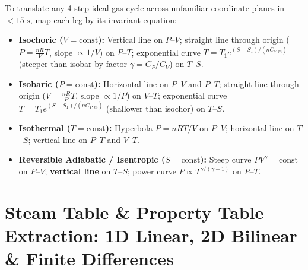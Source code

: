 \begin{shortcut}
To translate any 4-step ideal-gas cycle across unfamiliar coordinate planes in $<15\text{ s}$, map each leg by its invariant equation:
\begin{itemize}
  \item \textbf{Isochoric ($V = \text{const}$):} Vertical line on $P$--$V$; straight line through origin ($P = \frac{nR}{V}T$, slope $\propto 1/V$) on $P$--$T$; exponential curve $T = T_1 e^{(S-S_1)/(nC_{V,m})}$ (steeper than isobar by factor $\gamma = C_P/C_V$) on $T$--$S$.
  \item \textbf{Isobaric ($P = \text{const}$):} Horizontal line on $P$--$V$ and $P$--$T$; straight line through origin ($V = \frac{nR}{P}T$, slope $\propto 1/P$) on $V$--$T$; exponential curve $T = T_1 e^{(S-S_1)/(nC_{P,m})}$ (shallower than isochor) on $T$--$S$.
  \item \textbf{Isothermal ($T = \text{const}$):} Hyperbola $P = nRT/V$ on $P$--$V$; horizontal line on $T$--$S$; vertical line on $P$--$T$ and $V$--$T$.
  \item \textbf{Reversible Adiabatic / Isentropic ($S = \text{const}$):} Steep curve $PV^\gamma = \text{const}$ on $P$--$V$; \textbf{vertical line} on $T$--$S$; power curve $P \propto T^{\gamma/(\gamma-1)}$ on $P$--$T$.
\end{itemize}
\end{shortcut}

\section{Steam Table \& Property Table Extraction: 1D Linear, 2D Bilinear \& Finite Differences}\label{sec:18.2}

